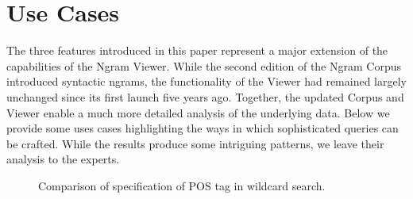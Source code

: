\documentclass[11pt,a4paper]{article}
\begin{document}
\section{Use Cases}
\label{sec:usecases}

The three features introduced in this paper represent a major extension of the capabilities of the Ngram Viewer. While the second edition of the Ngram Corpus \cite{lin2012syntactic} introduced syntactic ngrams, the functionality of the Viewer had remained largely unchanged since its first launch five years ago. Together, the updated Corpus and Viewer enable a much more detailed analysis of the underlying data. Below we provide some uses cases highlighting the ways in which sophisticated queries can be crafted. While the results produce some intriguing patterns, we leave their analysis to the experts.

\begin{figure}[t]
\vspace{-0.1in}
\vspace*{-1em}
\caption{\label{fig:light} Comparison of specification of POS tag in wildcard search.}
\end{figure}
\end{document}
